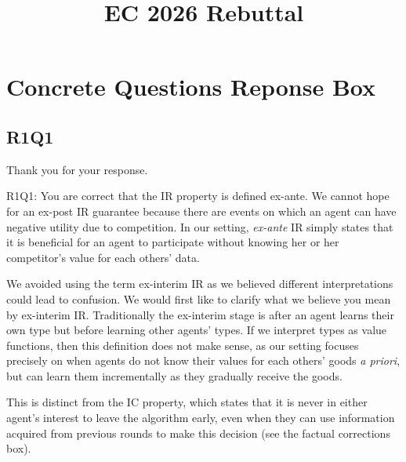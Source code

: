 \documentclass[11pt]{extarticle}
\newcommand{\comment}[1]{\textcolor{red}{(#1)}}
\begin{document}
\title{EC 2026 Rebuttal}
\author{}
\date{}
\maketitle

\newcommand{\kkcomment}[1]{\textcolor{magenta}{(#1 --KK)}}

\section{Concrete Questions Reponse Box}

\subsection*{R1Q1}

Thank you for your response.

\vspace{0.2cm}
\noindent 
R1Q1: You are correct that the IR property is defined ex-ante. We cannot hope for an 
ex-post IR guarantee because there are events on which an agent can have negative
utility due to competition. In our setting, \emph{ex-ante} IR simply states that it is beneficial for an agent to participate without knowing her or her competitor's value for each others' data. 

\vspace{0.2cm}
\noindent 
We avoided using the term ex-interim IR as we believed different 
interpretations could lead to confusion. We would first like to clarify what we believe
you mean by ex-interim IR. Traditionally the ex-interim stage is after an agent learns
their own type but before learning other agents' types. If we interpret types as 
value functions, then this definition does not make sense, as our setting focuses precisely on when agents do not know their values for each others' goods \emph{a priori}, but can learn them incrementally as they gradually receive the goods.

This is distinct from the IC property, which states that it is never in either 
agent's interest to leave the algorithm early, even when they can use information acquired
from previous rounds to make this decision (see the factual corrections box).
\end{document}
